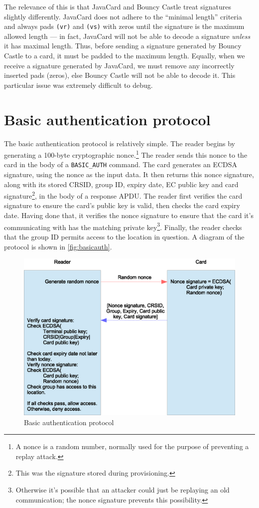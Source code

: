 \documentclass[12pt,a4paper,twoside,openright]{report}
\begin{document}
The relevance of this is that JavaCard and Bouncy Castle treat signatures slightly differently. JavaCard does not adhere to the ``minimal length'' criteria and always pads \texttt{(vr)} and \texttt{(vs)} with zeros until the signature is the maximum allowed length --- in fact, JavaCard will not be able to decode a signature \emph{unless} it has maximal length. Thus, before sending a signature generated by Bouncy Castle to a card, it must be padded to the maximum length. Equally, when we receive a signature generated by JavaCard, we must remove any incorrectly inserted pads (zeros), else Bouncy Castle will not be able to decode it. This particular issue was extremely difficult to debug.

\section{Basic authentication protocol}
\label{basicauth}

The basic authentication protocol is relatively simple. The reader begins by generating a 100-byte cryptographic nonce.\footnote{A nonce is a random number, normally used for the purpose of preventing a replay attack.} The reader sends this nonce to the card in the body of a \texttt{BASIC\_AUTH} command. The card generates an ECDSA signature, using the nonce as the input data. It then returns this nonce signature, along with its stored CRSID, group ID, expiry date, EC public key and card signature\footnote{This was the signature stored during provisioning.}, in the body of a response APDU. The reader first verifies the card signature to ensure the card's public key is valid, then checks the card expiry date. Having done that, it verifies the nonce signature to ensure that the card it's communicating with has the matching private key\footnote{Otherwise it's possible that an attacker could just be replaying an old communication; the nonce signature prevents this possibility.}. Finally, the reader checks that the group ID permits access to the location in question. A diagram of the protocol is shown in \autoref{fig:basicauth}.

\begin{figure}[tbh]
\centerline{\includegraphics[scale=0.8]{figures/basicauth.eps}}
\caption{Basic authentication protocol}
\label{fig:basicauth}
\end{figure}
\end{document}
